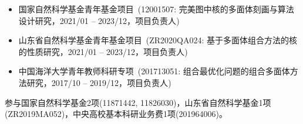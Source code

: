 %
%


{
\fontsize{9.5pt}{\baselineskip}\selectfont

\begin{itemize}[leftmargin=*]
	\item {国家自然科学基金青年基金项目}~(12001507: 完美图中核的多面体刻画与算法设计研究，2021/01 -- 2023/12，{项目负责人})
	\item {山东省自然科学基金青年基金项目}~(ZR2020QA024: 基于多面体组合方法的核的性质研究，2021/01 -- 2023/12，{项目负责人})
	\item {中国海洋大学青年教师科研专项}~(201713051: 组合最优化问题的组合多面体方法研究，2017/10 -- 2019/12，{项目负责人})
\end{itemize}

参与国家自然科学基金2项(11871442, 11826030)，山东省自然科学基金1项(ZR2019MA052)，中央高校基本科研业务费1项(201964006)。
}
\iffalse
 \begin{tabular}{rl}	
	2021 -- 2023 & %
	{\hspace{-.5em}\textbf{国家自然科学基金青年基金项目}}~(12001507: 完美图中核的多面体刻画与算法设计研究)，\textbf{项目负责人}\\
	2020 -- 2023 & %
	{\hspace{-.5em}\textbf{山东省自然科学基金青年基金项目}}~(ZR2020QA024: 基于多面体组合方法的核的性质研究)，\textbf{项目负责人}\\
	2017 -- 2019 & %
	{\hspace{-.5em}\textbf{中国海洋大学青年教师科研专项}}~(201713051: 组合最优化问题的组合多面体方法研究)，\textbf{项目负责人}
\end{tabular}
\fi

